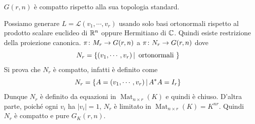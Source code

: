 \documentclass[a4paper]{article}
\begin{document}
\begin{snippetproposition}{}
    \(G(r,n)\) è compatto rispetto alla sua topologia standard.
\end{snippetproposition}

\begin{snippetproof}{}
    Possiamo generare \(L = \mathcal L(v_1, \cdots, v_r)\)
    usando solo basi ortonormali rispetto
    al prodotto scalare euclideo
    di \(\mathbb{R}^n\)
    oppure Hermitiano di \(\mathbb{C}\).
    Quindi esiste restrizione della proiezione canonica.
    \(\pi \colon M_r \to G(r,n)\)
    a \(\pi \colon N_r \to G(r,n)\)
    dove
    \[
        N_r = \{
            (v_1, \cdots, v_r)
            \,|\, \text{ ortonormali }    
        \}
    \]
    Si prova che \(N_r\) è compatto, infatti è definito come
    \[
        N_r = \{
            A = (v_1, \cdots, v_r) \,|\,
            A^*A = I_r
        \}
    \]
    Dunque \(N_r\) è definito da equazioni in \(\operatorname{Mat}_{n \times r}(K)\)
    e quindi è chiuso.
    D'altra parte, poiché ogni \(v_i\) ha
    \(|v_i| = 1\),
    \(N_r\) è limitato
    in \(\operatorname{Mat}_{n \times r}(K) = K^{nr}\).
    Quindi \(N_r\) è compatto e pure \(G_K(r,n)\).
\end{snippetproof}
\end{document}
